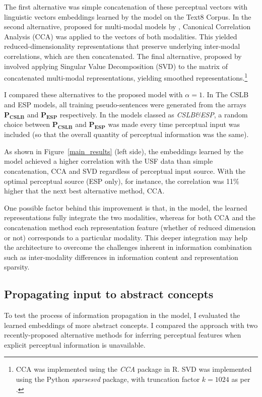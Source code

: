 The first alternative was simple concatenation of these perceptual vectors with linguistic vectors embeddings learned by the \cite{mikolov2013efficient} model on the Text8 Corpus. In the second alternative, proposed for multi-modal models by \cite{silberer2012grounded}, Canonical Correlation Analysis (CCA) \citep{hardoon2004canonical} was applied to the vectors of both modalities. This yielded reduced-dimensionality representations that preserve underlying inter-modal correlations, which are then concatenated. The final alternative, proposed by \cite{bruni2014multimodal} involved applying Singular Value Decomposition (SVD) to the matrix of concatenated multi-modal representations, yielding smoothed representations.\footnote{CCA was implemented using the \emph{CCA} package in R. SVD was implemented using the Python \emph{sparsesvd} package, with truncation factor \(k=1024\) as per \cite{bruni2014multimodal}.}

I compared these alternatives to the proposed model with \(\alpha = 1\). In The CSLB and ESP models, all training pseudo-sentences were generated from the arrays \(\mathbf{P_{CSLB}}\) and \(\mathbf{P_{ESP}}\) respectively. In the models classed as \emph{CSLB\&ESP}, a random choice between \(\mathbf{P_{CSLB}}\) and \(\mathbf{P_{ESP}}\) was made every time perceptual input was included (so that the overall quantity of perceptual information was the same). 

As shown in Figure~\ref{main_results} (left side), the embeddings learned by the model achieved a higher correlation with the USF data than simple concatenation, CCA and SVD regardless of perceptual input source. With the optimal perceptual source (ESP only), for instance, the correlation was 11\% higher that the next best alternative method, CCA. 

One possible factor behind this improvement is that, in the model, the learned representations fully integrate the two modalities, whereas for both CCA and the concatenation method each representation feature (whether of reduced dimension or not) corresponds to a particular modality. This deeper integration may help the architecture to overcome the challenges inherent in information combination such as inter-modality differences in information content and representation sparsity.   


\subsection{Propagating input to abstract concepts} 
\label{conc2}
To test the process of information propagation in the model, I evaluated the learned embeddings of more abstract concepts. I compared the approach with two recently-proposed alternative methods for inferring perceptual features when explicit perceptual information is unavailable. 

